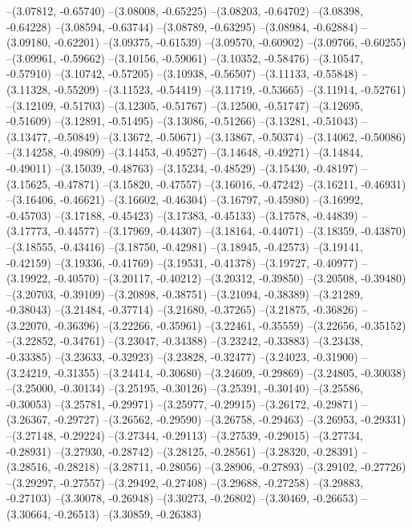 --(3.07812, -0.65740)
--(3.08008, -0.65225)
--(3.08203, -0.64702)
--(3.08398, -0.64228)
--(3.08594, -0.63744)
--(3.08789, -0.63295)
--(3.08984, -0.62884)
--(3.09180, -0.62201)
--(3.09375, -0.61539)
--(3.09570, -0.60902)
--(3.09766, -0.60255)
--(3.09961, -0.59662)
--(3.10156, -0.59061)
--(3.10352, -0.58476)
--(3.10547, -0.57910)
--(3.10742, -0.57205)
--(3.10938, -0.56507)
--(3.11133, -0.55848)
--(3.11328, -0.55209)
--(3.11523, -0.54419)
--(3.11719, -0.53665)
--(3.11914, -0.52761)
--(3.12109, -0.51703)
--(3.12305, -0.51767)
--(3.12500, -0.51747)
--(3.12695, -0.51609)
--(3.12891, -0.51495)
--(3.13086, -0.51266)
--(3.13281, -0.51043)
--(3.13477, -0.50849)
--(3.13672, -0.50671)
--(3.13867, -0.50374)
--(3.14062, -0.50086)
--(3.14258, -0.49809)
--(3.14453, -0.49527)
--(3.14648, -0.49271)
--(3.14844, -0.49011)
--(3.15039, -0.48763)
--(3.15234, -0.48529)
--(3.15430, -0.48197)
--(3.15625, -0.47871)
--(3.15820, -0.47557)
--(3.16016, -0.47242)
--(3.16211, -0.46931)
--(3.16406, -0.46621)
--(3.16602, -0.46304)
--(3.16797, -0.45980)
--(3.16992, -0.45703)
--(3.17188, -0.45423)
--(3.17383, -0.45133)
--(3.17578, -0.44839)
--(3.17773, -0.44577)
--(3.17969, -0.44307)
--(3.18164, -0.44071)
--(3.18359, -0.43870)
--(3.18555, -0.43416)
--(3.18750, -0.42981)
--(3.18945, -0.42573)
--(3.19141, -0.42159)
--(3.19336, -0.41769)
--(3.19531, -0.41378)
--(3.19727, -0.40977)
--(3.19922, -0.40570)
--(3.20117, -0.40212)
--(3.20312, -0.39850)
--(3.20508, -0.39480)
--(3.20703, -0.39109)
--(3.20898, -0.38751)
--(3.21094, -0.38389)
--(3.21289, -0.38043)
--(3.21484, -0.37714)
--(3.21680, -0.37265)
--(3.21875, -0.36826)
--(3.22070, -0.36396)
--(3.22266, -0.35961)
--(3.22461, -0.35559)
--(3.22656, -0.35152)
--(3.22852, -0.34761)
--(3.23047, -0.34388)
--(3.23242, -0.33883)
--(3.23438, -0.33385)
--(3.23633, -0.32923)
--(3.23828, -0.32477)
--(3.24023, -0.31900)
--(3.24219, -0.31355)
--(3.24414, -0.30680)
--(3.24609, -0.29869)
--(3.24805, -0.30038)
--(3.25000, -0.30134)
--(3.25195, -0.30126)
--(3.25391, -0.30140)
--(3.25586, -0.30053)
--(3.25781, -0.29971)
--(3.25977, -0.29915)
--(3.26172, -0.29871)
--(3.26367, -0.29727)
--(3.26562, -0.29590)
--(3.26758, -0.29463)
--(3.26953, -0.29331)
--(3.27148, -0.29224)
--(3.27344, -0.29113)
--(3.27539, -0.29015)
--(3.27734, -0.28931)
--(3.27930, -0.28742)
--(3.28125, -0.28561)
--(3.28320, -0.28391)
--(3.28516, -0.28218)
--(3.28711, -0.28056)
--(3.28906, -0.27893)
--(3.29102, -0.27726)
--(3.29297, -0.27557)
--(3.29492, -0.27408)
--(3.29688, -0.27258)
--(3.29883, -0.27103)
--(3.30078, -0.26948)
--(3.30273, -0.26802)
--(3.30469, -0.26653)
--(3.30664, -0.26513)
--(3.30859, -0.26383)
